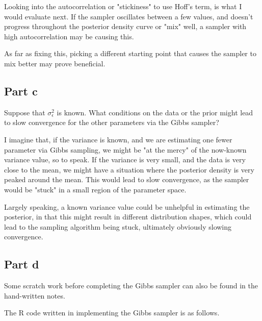 \documentclass[12pt, letterpaper]{article}
\begin{document}
Looking into the autocorrelation or "stickiness" to use Hoff's term, is what I would evaluate next. If the sampler oscillates between a few values, and doesn't progress throughout the posterior density curve or "mix" well, a sampler with high autocorrelation may be causing this. 

As far as fixing this, picking a different starting point that causes the sampler to mix better may prove beneficial. 

\subsection{Part c} 

Suppose that $\sigma_{\epsilon}^2$ is known. What conditions on the data or the prior might lead to slow convergence for the other parameters via the Gibbs sampler?

I imagine that, if the variance is known, and we are estimating one fewer parameter via Gibbs sampling, we might be "at the mercy" of the now-known variance value, so to speak. If the variance is very small, and the data is very close to the mean, we might have a situation where the posterior density is very peaked around the mean. This would lead to slow convergence, as the sampler would be "stuck" in a small region of the parameter space. 

Largely speaking, a known variance value could be unhelpful in estimating the posterior, in that this might result in different distribution shapes, which could lead to the sampling algorithm being stuck, ultimately obviously slowing convergence. 

\subsection{Part d} 

Some scratch work before completing the Gibbs sampler can also be found in the hand-written notes. 

The R code written in implementing the Gibbs sampler is as follows. 
\end{document}
